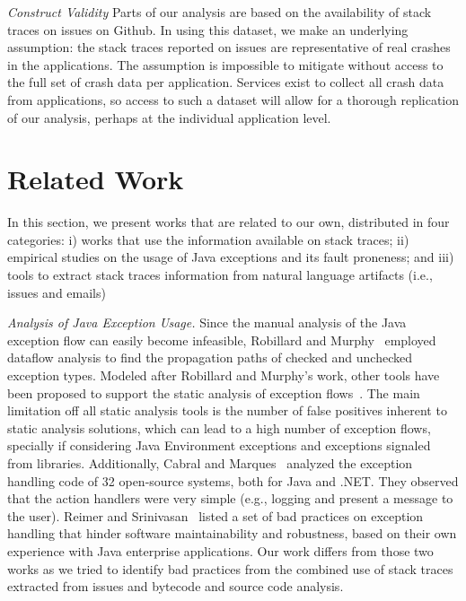 \documentclass[conference]{IEEEtran}
\begin{document}
\noindent\emph{Construct Validity} Parts of our analysis are based on the availability of stack traces on issues on
Github. In using this dataset, we make an underlying assumption: the
stack traces reported on issues are representative of real crashes in
the applications. The assumption is impossible to mitigate without access to
the full set of crash data per application. Services exist to collect all
crash data from applications, so access to such a dataset will allow for
a thorough replication of our analysis, perhaps at the individual application
level.

\section{Related Work}

In this section, we present works that are related to our own, distributed in
four categories: i) works that use the information available on stack traces;
ii) empirical studies on the usage of Java exceptions and its fault proneness;
and iii) tools to extract stack traces information from natural language artifacts
(i.e., issues and emails)

\textit{Analysis of Java Exception Usage.} Since the manual analysis of the Java
exception flow can easily become infeasible, Robillard and Murphy~\cite{Robil00}
employed dataflow analysis to find the propagation paths of checked and
unchecked exception types. Modeled after Robillard and Murphy's work, other
tools have been proposed to support the static analysis of exception
flows~\cite{coelho2008assessing}. The main limitation off all
static analysis tools is the number of false positives inherent to static analysis
solutions, which can lead to a high number of exception flows, specially if
considering Java Environment exceptions and exceptions signaled from libraries.
Additionally, Cabral and Marques~\cite{cabral2007exception} analyzed the
exception handling code of 32 open-source systems, both for Java and .NET. They
observed that the action handlers were very simple (e.g., logging and present a
message to the user). Reimer and Srinivasan~\cite{reimer2003analyzing} listed a
set of bad practices on exception handling that hinder software maintainability
and robustness, based on their own experience with Java enterprise applications.
Our work differs from those two works as we tried to identify bad practices from
the combined use of stack traces extracted from issues and bytecode and source
code analysis. 
\end{document}
